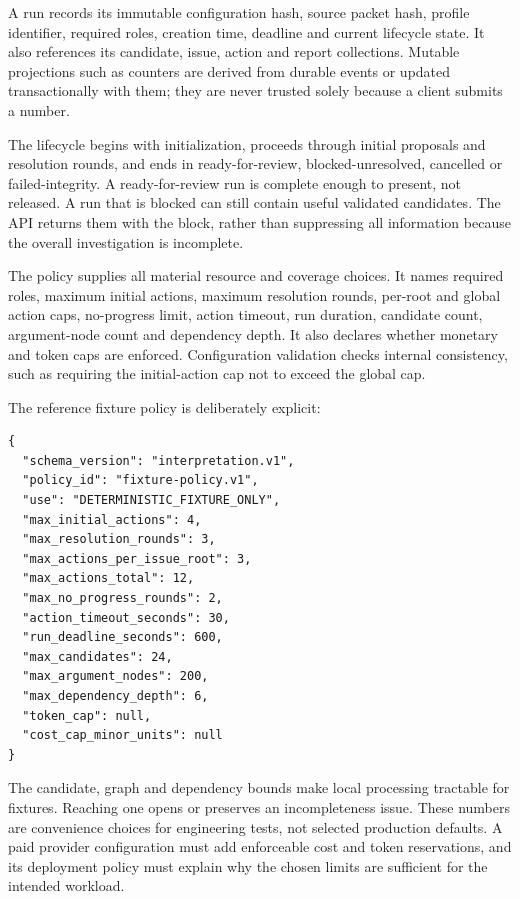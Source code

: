 A run records its immutable configuration hash, source packet hash, profile
identifier, required roles, creation time, deadline and current lifecycle state.
It also references its candidate, issue, action and report collections. Mutable
projections such as counters are derived from durable events or updated
transactionally with them; they are never trusted solely because a client submits
a number.

The lifecycle begins with initialization, proceeds through initial proposals and
resolution rounds, and ends in ready-for-review, blocked-unresolved, cancelled or
failed-integrity. A ready-for-review run is complete enough to present, not
released. A run that is blocked can still contain useful validated candidates.
The API returns them with the block, rather than suppressing all information
because the overall investigation is incomplete.

The policy supplies all material resource and coverage choices. It names required
roles, maximum initial actions, maximum resolution rounds, per-root and global
action caps, no-progress limit, action timeout, run duration, candidate count,
argument-node count and dependency depth. It also declares whether monetary and
token caps are enforced. Configuration validation checks internal consistency,
such as requiring the initial-action cap not to exceed the global cap.


The reference fixture policy is deliberately explicit:
\begin{lstlisting}[caption={Reference limits for deterministic controller fixtures.}]
{
  "schema_version": "interpretation.v1",
  "policy_id": "fixture-policy.v1",
  "use": "DETERMINISTIC_FIXTURE_ONLY",
  "max_initial_actions": 4,
  "max_resolution_rounds": 3,
  "max_actions_per_issue_root": 3,
  "max_actions_total": 12,
  "max_no_progress_rounds": 2,
  "action_timeout_seconds": 30,
  "run_deadline_seconds": 600,
  "max_candidates": 24,
  "max_argument_nodes": 200,
  "max_dependency_depth": 6,
  "token_cap": null,
  "cost_cap_minor_units": null
}
\end{lstlisting}

The candidate, graph and dependency bounds make local processing tractable for
fixtures. Reaching one opens or preserves an incompleteness issue. These numbers
are convenience choices for engineering tests, not selected production defaults.
A paid provider configuration must add enforceable cost and token reservations,
and its deployment policy must explain why the chosen limits are sufficient for
the intended workload.

